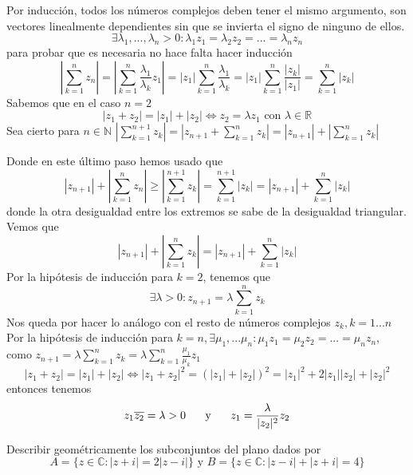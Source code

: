 \begin{sol}
	
	
	
	Por inducción, todos los números complejos deben tener el mismo argumento, son vectores linealmente dependientes sin que se invierta el signo de ninguno de ellos.
	$$\exists\lambda_1,...,\lambda_n>0 : \lambda_1 z_1 = \lambda_2 z_2 = ... = \lambda_n z_n$$
	para probar que es necesaria no hace falta hacer inducción
	$$ \left|\sum_{k=1}^n z_n\right| 
	=
	\left|\sum_{k=1}^n \frac{\lambda_1}{\lambda_k} z_1\right| 
	=
	|z_1|\sum_{k=1}^n \frac{\lambda_1}{\lambda_k} 
	=
	|z_1|\sum_{k=1}^n \frac{|z_k|}{|z_1|} 
	=
	\sum_{k=1}^n |z_k|$$
	Sabemos que en el caso $n=2$
	$$|z_1+z_2| = |z_1| + |z_2| \Longleftrightarrow z_2 = \lambda z_1\text{ con }\lambda \in \mathbb{R}$$
	Sea cierto para $n\in\mathbb{N}$
	$|\sum_{k=1}^{n+1} z_k| 
	=
	|z_{n+1} + \sum_{k=1}^n z_k|
	=
	|z_{n+1}| + |\sum_{k=1}^n z_k|$
	
	Donde en este último paso hemos usado que
	$$|z_{n+1}|+\left|\sum_{k=1}^nz_n\right| 
	\geq 
	\left|\sum_{k=1}^{n+1} z_k\right|=\sum_{k=1}^{n+1} |z_k| = |z_{n+1}| + \sum_{k=1}^n |z_k|$$
	donde la otra desigualdad entre los extremos se sabe de la desigualdad triangular.
	Vemos que
	$$|z_{n+1}| + \left|\sum_{k=1}^n z_k\right| 
	=
	|z_{n+1}| + \sum_{k=1}^n |z_k|$$
	Por la hipótesis de inducción para $k=2$, tenemos que 
	$$\exists \lambda >0 : z_{n+1} = \lambda \sum_{k=1}^n z_k$$
	Nos queda por hacer lo análogo con el resto de números complejos $z_k,k=1...n$
	Por la hipótesis de inducción para $k=n, \exists \mu_1,...\mu_n : \mu_1 z_1 = \mu_2 z_2=...= \mu_n z_n$,
	como $z_{n+1} = \lambda \sum_{k=1}^n z_k 
	=
	\lambda \sum_{k=1}^n \frac{\mu_1}{\mu_k} z_1$
	$$ |z_1+z_2| = |z_1|+|z_2| 
	\Longleftrightarrow
	|z_1+z_2|^2 = (|z_1|+|z_2|)^2 
	=
	|z_1|^2 + 2|z_1||z_2|+|z_2|^2$$
	entonces tenemos
	$$z_1 \overline{z_2}=\lambda>0 \hspace{0.5cm}\text{ y }\hspace{0.5cm} z_1 = \frac{\lambda}{|z_2|^2 }z_2 
	$$
	
\end{sol}

\begin{ejer}
	Describir geométricamente los subconjuntos del plano dados por
	$$ A=\{ z\in\mathbb{C} : |z+i|=2|z-i| \} \text{ y } B=\{ z\in\mathbb{C} : |z-i| + |z+i| = 4 \} $$
\end{ejer}

